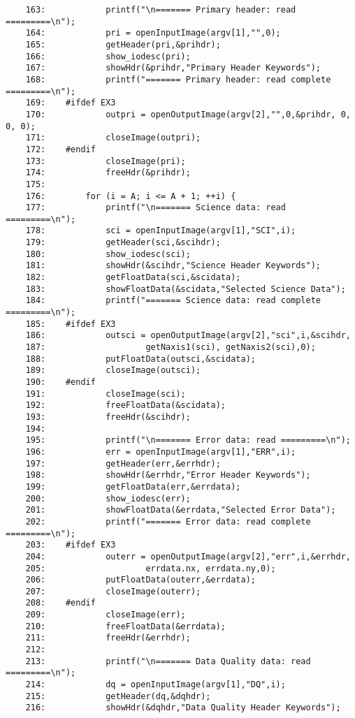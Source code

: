 \begin{scriptsize}
\begin{verbatim}
    163:            printf("\n======= Primary header: read =========\n");
    164:            pri = openInputImage(argv[1],"",0);
    165:            getHeader(pri,&prihdr);
    166:            show_iodesc(pri);
    167:            showHdr(&prihdr,"Primary Header Keywords");
    168:            printf("======= Primary header: read complete =========\n");
    169:    #ifdef EX3
    170:            outpri = openOutputImage(argv[2],"",0,&prihdr, 0, 0, 0);
    171:            closeImage(outpri);
    172:    #endif
    173:            closeImage(pri);
    174:            freeHdr(&prihdr);
    175:    
    176:        for (i = A; i <= A + 1; ++i) {
    177:            printf("\n======= Science data: read =========\n");
    178:            sci = openInputImage(argv[1],"SCI",i);
    179:            getHeader(sci,&scihdr);
    180:            show_iodesc(sci);
    181:            showHdr(&scihdr,"Science Header Keywords");
    182:            getFloatData(sci,&scidata);
    183:            showFloatData(&scidata,"Selected Science Data");
    184:            printf("======= Science data: read complete =========\n");
    185:    #ifdef EX3
    186:            outsci = openOutputImage(argv[2],"sci",i,&scihdr, 
    187:                    getNaxis1(sci), getNaxis2(sci),0);
    188:            putFloatData(outsci,&scidata);
    189:            closeImage(outsci);
    190:    #endif
    191:            closeImage(sci);
    192:            freeFloatData(&scidata);
    193:            freeHdr(&scihdr);
    194:    
    195:            printf("\n======= Error data: read =========\n");
    196:            err = openInputImage(argv[1],"ERR",i);
    197:            getHeader(err,&errhdr);
    198:            showHdr(&errhdr,"Error Header Keywords");
    199:            getFloatData(err,&errdata);
    200:            show_iodesc(err);
    201:            showFloatData(&errdata,"Selected Error Data");
    202:            printf("======= Error data: read complete =========\n");
    203:    #ifdef EX3
    204:            outerr = openOutputImage(argv[2],"err",i,&errhdr, 
    205:                    errdata.nx, errdata.ny,0);
    206:            putFloatData(outerr,&errdata);
    207:            closeImage(outerr);
    208:    #endif
    209:            closeImage(err);
    210:            freeFloatData(&errdata);
    211:            freeHdr(&errhdr);
    212:    
    213:            printf("\n======= Data Quality data: read =========\n");
    214:            dq = openInputImage(argv[1],"DQ",i);
    215:            getHeader(dq,&dqhdr);
    216:            showHdr(&dqhdr,"Data Quality Header Keywords");

\end{verbatim}
\end{scriptsize}
